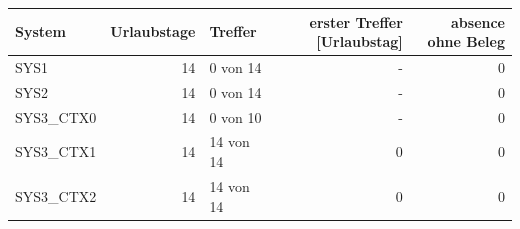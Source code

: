 \begin{tabular}{lrlrr}
\toprule
System & Urlaubstage & Treffer & erster Treffer [Urlaubstag] & absence ohne Beleg \\
\midrule
SYS1 & 14 & 0 von 14 & - & 0 \\
SYS2 & 14 & 0 von 14 & - & 0 \\
SYS3\_CTX0 & 14 & 0 von 10 & - & 0 \\
SYS3\_CTX1 & 14 & 14 von 14 & 0 & 0 \\
SYS3\_CTX2 & 14 & 14 von 14 & 0 & 0 \\
\bottomrule
\end{tabular}
